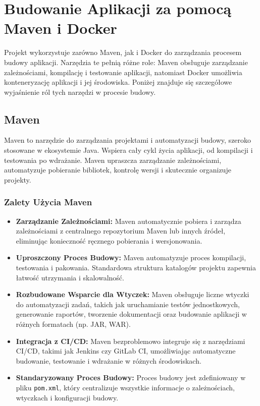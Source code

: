\section{Budowanie Aplikacji za pomocą Maven i Docker}

Projekt wykorzystuje zarówno Maven, jak i Docker do zarządzania procesem budowy aplikacji. Narzędzia te pełnią różne role: Maven obsługuje zarządzanie zależnościami, kompilację i testowanie aplikacji, natomiast Docker umożliwia konteneryzację aplikacji i jej środowiska. Poniżej znajduje się szczegółowe wyjaśnienie ról tych narzędzi w procesie budowy.

\subsection{Maven}

Maven to narzędzie do zarządzania projektami i automatyzacji budowy, szeroko stosowane w ekosystemie Java. Wspiera cały cykl życia aplikacji, od kompilacji i testowania po wdrażanie. Maven upraszcza zarządzanie zależnościami, automatyzuje pobieranie bibliotek, kontrolę wersji i skutecznie organizuje projekty.

\subsubsection{Zalety Użycia Maven}

\begin{itemize}
    \item \textbf{Zarządzanie Zależnościami:} Maven automatycznie pobiera i zarządza zależnościami z centralnego repozytorium Maven lub innych źródeł, eliminując konieczność ręcznego pobierania i wersjonowania.
    \item \textbf{Uproszczony Proces Budowy:} Maven automatyzuje proces kompilacji, testowania i pakowania. Standardowa struktura katalogów projektu zapewnia łatwość utrzymania i skalowalność.
    \item \textbf{Rozbudowane Wsparcie dla Wtyczek:} Maven obsługuje liczne wtyczki do automatyzacji zadań, takich jak uruchamianie testów jednostkowych, generowanie raportów, tworzenie dokumentacji oraz budowanie aplikacji w różnych formatach (np. JAR, WAR).
    \item \textbf{Integracja z CI/CD:} Maven bezproblemowo integruje się z narzędziami CI/CD, takimi jak Jenkins czy GitLab CI, umożliwiając automatyczne budowanie, testowanie i wdrażanie w różnych środowiskach.
    \item \textbf{Standaryzowany Proces Budowy:} Proces budowy jest zdefiniowany w pliku \texttt{pom.xml}, który centralizuje wszystkie informacje o zależnościach, wtyczkach i konfiguracji budowy.
\end{itemize}

